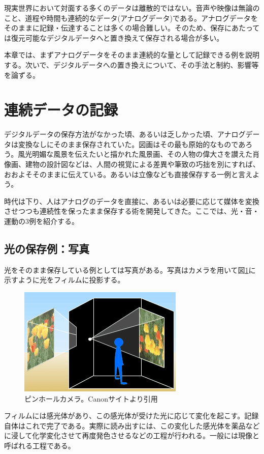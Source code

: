 現実世界において対面する多くのデータは離散的ではない。音声や映像は無論のこと、道程や時間も連続的なデータ(アナログデータ)である。アナログデータをそのままに記録・伝達することは多くの場合難しい。そのため、保存にあたっては復元可能なデジタルデータへと置き換えて保存される場合が多い。

本章では、まずアナログデータをそのまま連続的な量として記録できる例を説明する。次いで、デジタルデータへの置き換えについて、その手法と制約、影響等を論ずる。

\section{連続データの記録}

デジタルデータの保存方法がなかった頃、あるいは乏しかった頃、アナログデータは変換なしにそのまま保存されていた。図画はその最も原始的なものであろう。風光明媚な風景を伝えたいと描かれた風景画、その人物の偉大さを讃えた肖像画、建物の設計図などは、人間の視覚による差異や筆致の巧拙を別にすれば、おおよそそのままに伝えている。あるいは立像なども直接保存する一例と言えよう。

時代は下り、人はアナログのデータを直接に、あるいは必要に応じて媒体を変換させつつも連続性を保ったまま保存する術を開発してきた。ここでは、光・音・運動の3例を紹介する。

\subsection{光の保存例：写真}
光をそのまま保存している例としては写真がある。写真はカメラを用いて図\ref{fig2_1}に示すように光をフィルムに投影する。
\begin{figure}[htbp]
\centering
\includegraphics[width=0.6\linewidth,keepaspectratio,bb=0 0 298 195]{fig/fig2_1.png}
\caption{ピンホールカメラ。Canonサイトより引用}\label{fig2_1}
\end{figure}

フィルムには感光体があり、この感光体が受けた光に応じて変化を起こす。記録自体はこれで完了である。実際に読み出すには、この変化した感光体を薬品などに浸して化学変化させて再度発色させるなどの工程が行われる。一般には現像と呼ばれる工程である。

